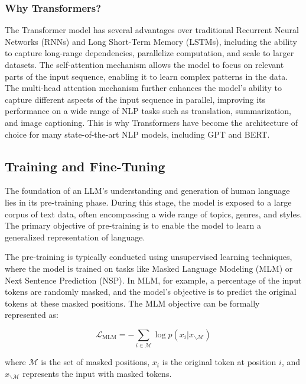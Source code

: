                 
                \subsubsection{Why Transformers?}
                The Transformer model has several advantages over traditional Recurrent Neural Networks (RNNs) and Long Short-Term Memory (LSTMs), including the ability to capture long-range dependencies, parallelize computation, and scale to larger datasets. The self-attention mechanism allows the model to focus on relevant parts of the input sequence, enabling it to learn complex patterns in the data. The multi-head attention mechanism further enhances the model's ability to capture different aspects of the input sequence in parallel, improving its performance on a wide range of NLP tasks such as translation, summarization, and image captioning. This is why Transformers have become the architecture of choice for many state-of-the-art NLP models, including GPT and BERT.

            \subsection{Training and Fine-Tuning}
            The foundation of an LLM's understanding and generation of human language lies in its pre-training phase. During this stage, the model is exposed to a large corpus of text data, often encompassing a wide range of topics, genres, and styles. The primary objective of pre-training is to enable the model to learn a generalized representation of language.
            
            The pre-training is typically conducted using unsupervised learning techniques, where the model is trained on tasks like Masked Language Modeling (MLM) or Next Sentence Prediction (NSP). In MLM, for example, a percentage of the input tokens are randomly masked, and the model's objective is to predict the original tokens at these masked positions. The MLM objective can be formally represented as:
            
            \begin{equation}
            \mathcal{L}_{\text{MLM}} = -\sum_{i \in \mathcal{M}} \log p(x_i | x_{\backslash \mathcal{M}})
            \end{equation}
            
            where $\mathcal{M}$ is the set of masked positions, $x_i$ is the original token at position $i$, and $x_{\backslash \mathcal{M}}$ represents the input with masked tokens.
            \vspace*{0.2cm}

